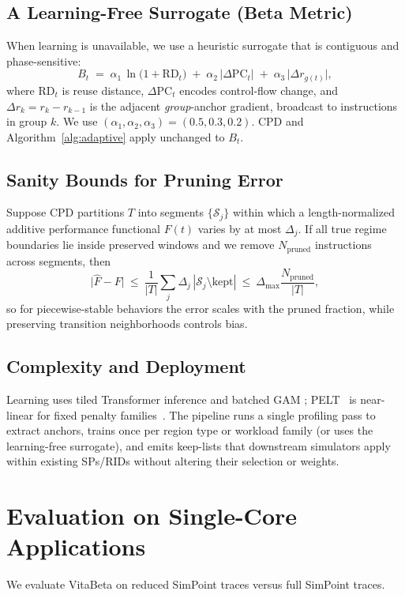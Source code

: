 \documentclass[conference]{IEEEtran}
\newcommand{\gam}{\textsc{GAM} }
\newcommand{\pelt}{\textsc{PELT} }
\begin{document}
\subsection{A Learning-Free Surrogate (Beta Metric)}
\label{subsec:beta}
When learning is unavailable, we use a heuristic surrogate that is contiguous and phase-sensitive:
\begin{equation}
\label{eq:beta}
B_t \;=\; \alpha_1\,\ln\big(1+\mathrm{RD}_t\big)\;+\;\alpha_2\,\big|\Delta\mathrm{PC}_t\big|\;+\;\alpha_3\,\big|\Delta r_{g(t)}\big|,
\end{equation}
where \(\mathrm{RD}_t\) is reuse distance, \(\Delta\mathrm{PC}_t\) encodes control-flow change, and \(\Delta r_k=r_k-r_{k-1}\) is the adjacent \emph{group}-anchor gradient, broadcast to instructions in group \(k\). We use \((\alpha_1,\alpha_2,\alpha_3)=(0.5,0.3,0.2)\). CPD and Algorithm~\ref{alg:adaptive} apply unchanged to \(B_t\).

\subsection{Sanity Bounds for Pruning Error}
Suppose CPD partitions \(T\) into segments \(\{\mathcal{S}_j\}\) within which a length-normalized additive performance functional \(F(t)\) varies by at most \(\Delta_j\). If all true regime boundaries lie inside preserved windows and we remove \(N_{\mathrm{pruned}}\) instructions across segments, then
\[
\big|\widehat{F}-F\big|\ \le\ \frac{1}{|T|}\sum_j \Delta_j\, |\mathcal{S}_j\setminus\text{kept}|\ \le\ \Delta_{\max}\frac{N_{\mathrm{pruned}}}{|T|},
\]
so for piecewise-stable behaviors the error scales with the pruned fraction, while preserving transition neighborhoods controls bias.

\subsection{Complexity and Deployment}
Learning uses tiled Transformer inference and batched \gam; \pelt\ is near-linear for fixed penalty families~\cite{pelt12,ruptures20}. The pipeline runs a single profiling pass to extract anchors, trains once per region type or workload family (or uses the learning-free surrogate), and emits keep-lists that downstream simulators apply within existing SPs/RIDs without altering their selection or weights.

  
 

\section{Evaluation on Single-Core Applications} 
\label{evaluation_sc}
We evaluate VitaBeta on reduced SimPoint traces versus full SimPoint traces.
\end{document}
